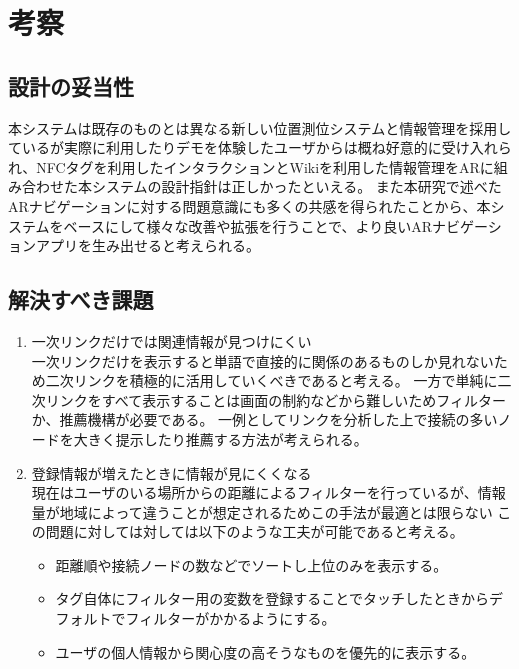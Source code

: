 \section{考察}

\subsection{設計の妥当性}
本システムは既存のものとは異なる新しい位置測位システムと情報管理を採用しているが実際に利用したりデモを体験したユーザからは概ね好意的に受け入れられ、NFCタグを利用したインタラクションとWikiを利用した情報管理をARに組み合わせた本システムの設計指針は正しかったといえる。
また本研究で述べたARナビゲーションに対する問題意識にも多くの共感を得られたことから、本システムをベースにして様々な改善や拡張を行うことで、より良いARナビゲーションアプリを生み出せると考えられる。

\subsection{解決すべき課題}

\begin{enumerate}
  \item 一次リンクだけでは関連情報が見つけにくい\\
  一次リンクだけを表示すると単語で直接的に関係のあるものしか見れないため二次リンクを積極的に活用していくべきであると考える。
  一方で単純に二次リンクをすべて表示することは画面の制約などから難しいためフィルターか、推薦機構が必要である。
  一例としてリンクを分析した上で接続の多いノードを大きく提示したり推薦する方法が考えられる。
  \item 登録情報が増えたときに情報が見にくくなる\\
  現在はユーザのいる場所からの距離によるフィルターを行っているが、情報量が地域によって違うことが想定されるためこの手法が最適とは限らない
  この問題に対しては対しては以下のような工夫が可能であると考える。
  \begin{itemize}
    \item 距離順や接続ノードの数などでソートし上位のみを表示する。
    \item タグ自体にフィルター用の変数を登録することでタッチしたときからデフォルトでフィルターがかかるようにする。
    \item ユーザの個人情報から関心度の高そうなものを優先的に表示する。
  \end{itemize}
\end{enumerate}

